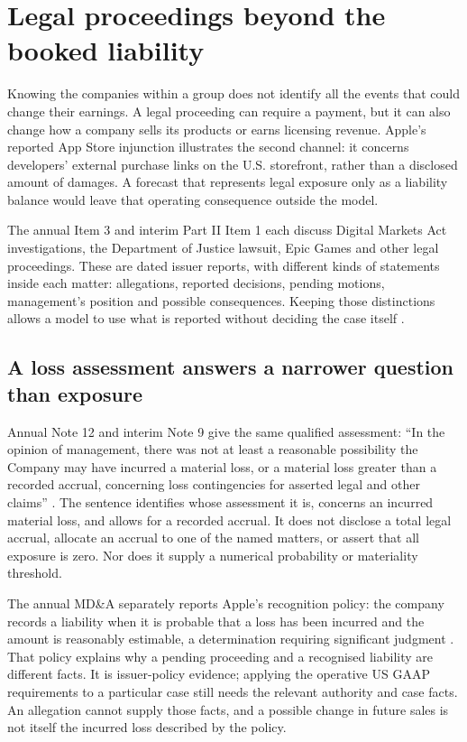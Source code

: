 \section{Legal proceedings beyond the booked liability}
\label{sec:apple-legal}

Knowing the companies within a group does not identify all the events that
could change their earnings. A legal proceeding can require a payment, but it
can also change how a company sells its products or earns licensing revenue.
Apple's reported App Store injunction illustrates the second channel: it
concerns developers' external purchase links on the U.S. storefront, rather
than a disclosed amount of damages. A forecast that represents legal exposure
only as a liability balance would leave that operating consequence outside
the model.

The annual Item 3 and interim Part II Item 1 each discuss Digital Markets Act
investigations, the Department of Justice lawsuit, Epic Games and other legal
proceedings. These are dated issuer reports, with different kinds of statements
inside each matter: allegations, reported decisions, pending motions,
management's position and possible consequences. Keeping those distinctions
allows a model to use what is reported without deciding the case itself
\citep[Item 3, printed p.~18]{apple2024}
\citep[Part II, Item 1, printed p.~18]{apple2025q1}.

\subsection{A loss assessment answers a narrower question than exposure}

Annual Note 12 and interim Note 9 give the same qualified assessment:
``In the opinion of management, there was not at least a reasonable possibility
the Company may have incurred a material loss, or a material loss greater than
a recorded accrual, concerning loss contingencies for asserted legal and other
claims'' \citep[Note 12, printed p.~46]{apple2024}
\citep[Note 9, printed p.~11]{apple2025q1}. The sentence identifies whose
assessment it is, concerns an incurred material loss, and allows for a recorded
accrual. It does not disclose a total legal accrual, allocate an accrual to one
of the named matters, or assert that all exposure is zero. Nor does it supply
a numerical probability or materiality threshold.

The annual MD\&A separately reports Apple's recognition policy: the company
records a liability when it is probable that a loss has been incurred and the
amount is reasonably estimable, a determination requiring significant judgment
\citep[Legal and Other Contingencies, printed p.~26]{apple2024}. That policy
explains why a pending proceeding and a recognised liability are different
facts. It is issuer-policy evidence; applying the operative US GAAP requirements
to a particular case still needs the relevant authority and case facts.
An allegation cannot supply those facts, and a possible change in future
sales is not itself the incurred loss described by the policy.

